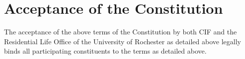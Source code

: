 \section{Acceptance of the Constitution}
\label{sec:acceptance-of-the-constitution}

The acceptance of the above terms of the Constitution by both CIF and the Residential Life Office of the University of Rochester as detailed above legally binds all participating constituents to the terms as detailed above.
